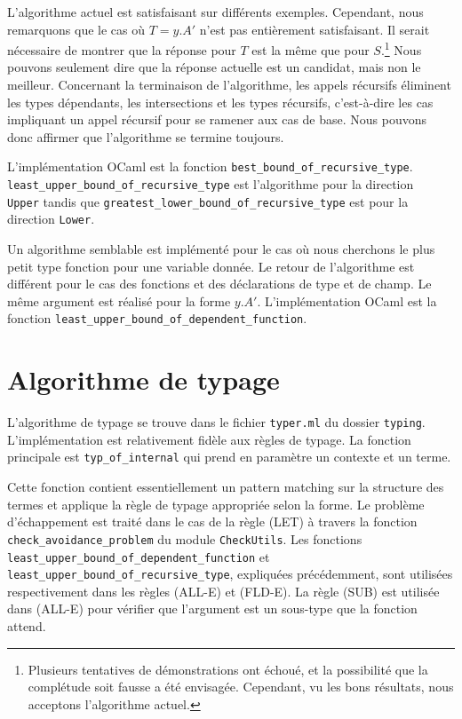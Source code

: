 L'algorithme actuel est satisfaisant sur différents exemples. Cependant, nous
remarquons que le cas où $T = y.A'$ n'est pas entièrement satisfaisant. Il serait nécessaire de
montrer que la réponse pour $T$ est la même que pour $S$.\footnote{Plusieurs
tentatives de démonstrations ont échoué, et la possibilité que la complétude soit
fausse a été envisagée.
Cependant, vu les bons résultats, nous acceptons l'algorithme actuel.} Nous
pouvons seulement dire que la réponse actuelle est un candidat, mais non le
meilleur. Concernant la terminaison de l'algorithme, les appels récursifs
éliminent les types dépendants, les intersections et les types récursifs,
c'est-à-dire les cas impliquant un appel récursif pour se ramener aux cas de
base. Nous pouvons donc affirmer que l'algorithme se termine toujours.

L'implémentation OCaml est la fonction \verb|best_bound_of_recursive_type|.
\verb|least_upper_bound_of_recursive_type| est l'algorithme pour la direction \\
\verb|Upper| tandis que \verb|greatest_lower_bound_of_recursive_type| est pour
la direction \verb|Lower|.

Un algorithme semblable est implémenté pour le cas où nous cherchons le plus
petit type fonction pour une variable donnée. Le retour de l'algorithme est
différent pour le cas des fonctions et des déclarations de type et de champ. Le
même argument est réalisé pour la forme $y.A'$.
L'implémentation OCaml est la fonction \verb|least_upper_bound_of_dependent_function|.

\section{Algorithme de typage}

L'algorithme de typage se trouve dans le fichier \verb|typer.ml| du dossier \verb|typing|.
L'implémentation est relativement fidèle aux règles de typage.
La fonction principale est \verb|typ_of_internal| qui prend en paramètre un
contexte et un terme. 

Cette fonction contient essentiellement un pattern matching sur la structure des
termes et applique la règle de typage appropriée selon la forme. Le problème
d'échappement est traité dans le cas de la règle (LET) à travers la
fonction \verb|check_avoidance_problem| du module \verb|CheckUtils|. Les
fonctions \verb|least_upper_bound_of_dependent_function| et \\
\verb|least_upper_bound_of_recursive_type|, expliquées précédemment, sont
utilisées respectivement dans les règles (ALL-E) et (FLD-E). La règle (SUB) est
utilisée dans (ALL-E) pour vérifier que l'argument est un sous-type que la
fonction attend.

